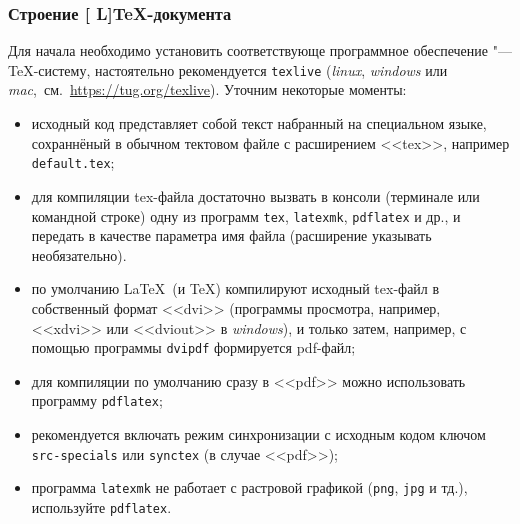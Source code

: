 \documentclass[%
10pt,
pdf,
intlimits,
sumlimits,
namelimits,
fleqn,
russian,
noamsthm,
hyperref={unicode},
utf8,
usepdftitle={false}, %
\ifdefined\aspectXVIxIX
aspectratio=169,
\else\fi
\ifdefined\printable
handout,
\else\fi
]{beamer}
\begin{document}
\begin{frame}[squeeze]
   \label{frame:stroenie_la_tex_dokumenta}
	\frametitle{Строение \textmd{[\!\! L\!\!]}\!\TeX\nobreak-документа}
	{\footnotesize
		\quad Для начала необходимо установить соответствующе программное обеспечение "---  \TeX-систему, настоятельно рекомендуется \texttt{texlive} (\textit{linux}, \textit{windows} или \textit{mac},~см.~\url{https://tug.org/texlive}). Уточним некоторые моменты:
		\begin{itemize}
			\item исходный код представляет собой текст набранный на специальном языке, сохраннёный в обычном тектовом файле с расширением <<tex>>, например \texttt{default.tex};
			\item для компиляции tex\nobreak-файла достаточно вызвать в консоли (терминале или командной строке) одну из программ \texttt{tex}, \texttt{latexmk}, \texttt{pdflatex} и др., и передать в качестве параметра имя файла (расширение указывать необязательно).
			\item по умолчанию \LaTeX\ (и \TeX) компилируют исходный tex\nobreak-файл в собственный формат <<dvi>> (программы просмотра, например, <<xdvi>> или <<dviout>> в \textit{windows}), и только затем, например, с помощью программы \texttt{dvipdf} формируется pdf\nobreak-файл;
			\item для компиляции по умолчанию сразу в <<pdf>> можно использовать программу \texttt{pdflatex};
			\item рекомендуется включать режим синхронизации с исходным кодом ключом \texttt{src-specials} или \texttt{synctex} (в случае <<pdf>>);
			\item \alert{программа \texttt{latexmk} не работает с растровой графикой (\texttt{png}, \texttt{jpg} и тд.), используйте \texttt{pdflatex}.}
		\end{itemize}
   }
\end{frame}
\end{document}

